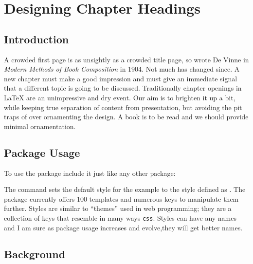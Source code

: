 
\chapter{Designing Chapter Headings}

\section{Introduction}

A crowded first page is as unsightly as a crowded title page, so wrote De Vinne in \emph{Modern Methods of Book Composition} in 1904.  Not much has changed since. A new chapter must make a good impression and must give an immediate signal that a different topic is going to be discussed. Traditionally chapter openings in LaTeX are an unimpressive and dry event. Our aim is to brighten it up a bit, while keeping true separation of content from presentation, but avoiding the pit traps of over ornamenting the design. A book is to be read and we should provide minimal ornamentation. 



\section{Package Usage}

To use the package include it just like any other package:


The command  sets the default style for the example to the style defined as . The package currently offers  100 templates and numerous keys to manipulate them further. Styles are similar to \enquote{themes} used in web programming; they are a collection of keys that resemble in many ways \texttt{css}. Styles can have any names and I am sure as package usage increases and evolve,they will get better names. 

\section{Background}

